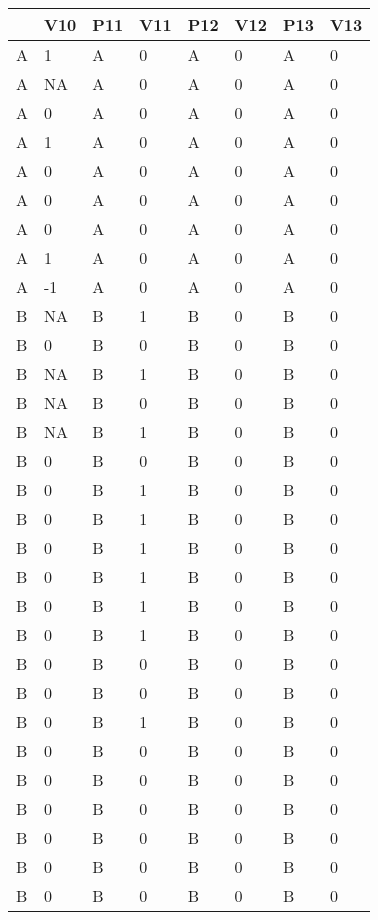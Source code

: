 \documentclass{article}
\begin{document}
\begin{table}

  
\begin{tabular}{l  l  l  l  l  l  l  l}

  \topruleP10 & V10 & P11 & V11 & P12 & V12 & P13 & V13\\ \midrule
A & 1 & A & 0 & A & 0 & A & 0\\ \midrule
A & NA & A & 0 & A & 0 & A & 0\\ \midrule
A & 0 & A & 0 & A & 0 & A & 0\\ \midrule
A & 1 & A & 0 & A & 0 & A & 0\\ \midrule
A & 0 & A & 0 & A & 0 & A & 0\\ \midrule
A & 0 & A & 0 & A & 0 & A & 0\\ \midrule
A & 0 & A & 0 & A & 0 & A & 0\\ \midrule
A & 1 & A & 0 & A & 0 & A & 0\\ \midrule
A & -1 & A & 0 & A & 0 & A & 0\\ \midrule
B & NA & B & 1 & B & 0 & B & 0\\ \midrule
B & 0 & B & 0 & B & 0 & B & 0\\ \midrule
B & NA & B & 1 & B & 0 & B & 0\\ \midrule
B & NA & B & 0 & B & 0 & B & 0\\ \midrule
B & NA & B & 1 & B & 0 & B & 0\\ \midrule
B & 0 & B & 0 & B & 0 & B & 0\\ \midrule
B & 0 & B & 1 & B & 0 & B & 0\\ \midrule
B & 0 & B & 1 & B & 0 & B & 0\\ \midrule
B & 0 & B & 1 & B & 0 & B & 0\\ \midrule
B & 0 & B & 1 & B & 0 & B & 0\\ \midrule
B & 0 & B & 1 & B & 0 & B & 0\\ \midrule
B & 0 & B & 1 & B & 0 & B & 0\\ \midrule
B & 0 & B & 0 & B & 0 & B & 0\\ \midrule
B & 0 & B & 0 & B & 0 & B & 0\\ \midrule
B & 0 & B & 1 & B & 0 & B & 0\\ \midrule
B & 0 & B & 0 & B & 0 & B & 0\\ \midrule
B & 0 & B & 0 & B & 0 & B & 0\\ \midrule
B & 0 & B & 0 & B & 0 & B & 0\\ \midrule
B & 0 & B & 0 & B & 0 & B & 0\\ \midrule
B & 0 & B & 0 & B & 0 & B & 0\\ \midrule
B & 0 & B & 0 & B & 0 & B & 0\\ \bottomrule


\end{tabular}


\end{table}
\end{document}
